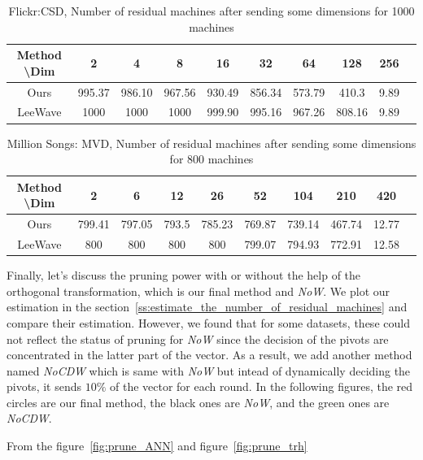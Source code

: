 \begin{table}[H]\begin{center}
\caption{Flickr:CSD, Number of residual machines after sending some dimensions for 1000 machines}\label{table:f2}
\begin{tabular}{|c|c|c|c|c|c|c|c|c|c|}
\hline 
Method \textbackslash Dim & 2 & 4 & 8 & 16 & 32 & 64 & 128 & 256\\ \hline \hline
Ours & 995.37 & 986.10 & 967.56 & 930.49 & 856.34 & 573.79 & 410.3 & 9.89 \\ \hline
LeeWave & 1000 & 1000 & 1000 & 999.90 & 995.16 & 967.26 & 808.16 & 9.89 \\ \hline
\end{tabular}
\end{center}\end{table}


\begin{table}[H]\begin{center}
\caption{Million Songs: MVD, Number of residual machines after sending some dimensions for 800 machines}\label{table:mvd}
\begin{tabular}{|c|c|c|c|c|c|c|c|c|c|}
\hline 
Method \textbackslash Dim & 2 & 6 & 12 & 26 & 52 & 104 & 210 & 420\\ \hline \hline
Ours & 799.41 & 797.05 & 793.5 & 785.23 & 769.87 & 739.14 & 467.74 & 12.77 \\ \hline
LeeWave & 800 & 800 & 800 & 800 & 799.07 & 794.93 & 772.91 & 12.58 \\ \hline
\end{tabular}
\end{center}\end{table}


Finally, let's discuss the pruning power with or without the help of the orthogonal transformation, which is our final method and \emph{NoW}.  We plot our estimation in the section~\ref{ss:estimate_the_number_of_residual_machines} and compare their estimation.  However, we found that for some datasets, these could not reflect the status of pruning for \emph{NoW} since the decision of the pivots are concentrated in the latter part of the vector.  As a result, we add another method named \emph{NoCDW} which is same with \emph{NoW} but intead of dynamically deciding the pivots, it sends $10\%$ of the vector for each round.  In the following figures, the red circles are our final method, the black ones are \emph{NoW}, and the green ones are \emph{NoCDW}.

From the figure~\ref{fig:prune_ANN} and figure~\ref{fig:prune_trh}

